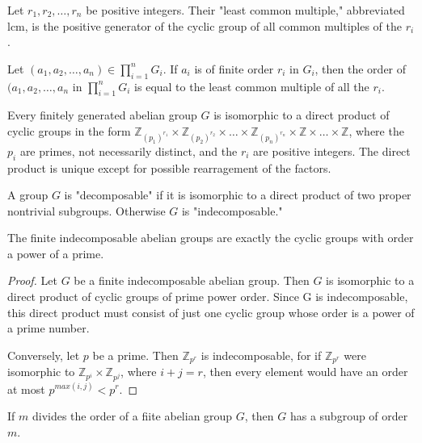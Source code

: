 \documentclass[a4paper,11pt]{article}
\begin{document}
\begin{outline}
    Let \(r_{1}, r_{2}, \ldots, r_{n}\) be positive integers. Their "least common multiple,"
    abbreviated lcm, is the positive generator of the cyclic group of all common multiples of the \(r_{i}\).
    
    Let \((a_{1}, a_{2}, \ldots, a_{n}) \in \prod_{i=1}^{n} G_{i}\). If \(a_{i}\) is of
    finite order \(r_{i}\) in \(G_{i}\), then the order of \((a_{1}, a_{2}, \ldots, a_{n}\) in 
    \(\prod_{i=1}^{n} G_{i}\) is equal to the least common multiple of all the \(r_{i}\).
    
    Every finitely generated abelian group \(G\) is isomorphic to a direct product of cyclic groups in 
    the form \(\mathbb{Z}_{(p_{1})^{r_{1}}} \times \mathbb{Z}_{(p_{2})^{r_{2}}} \times \ldots \times 
    \mathbb{Z}_{(p_{n})^{r_{n}}} \times \mathbb{Z} \times \ldots \times \mathbb{Z}\), where the \(p_{i}\) 
    are primes, not necessarily distinct, and the \(r_{i}\) are positive integers. The direct product is 
    unique except for possible rearragement of the factors.
    
    A group \(G\) is "decomposable" if it is isomorphic to a direct product of two proper
    nontrivial subgroups. Otherwise \(G\) is "indecomposable."
    
    The finite indecomposable abelian groups are exactly the cyclic groups with order a power of a prime.
    
    \begin{proof}
      \forward 
        Let \(G\) be a finite indecomposable abelian group. Then \(G\) is isomorphic to a 
        direct product of cyclic groups of prime power order. Since G is indecomposable, this direct product 
        must consist of just one cyclic group whose order is a power of a prime number.
        
      \backward 
        Conversely, let \(p\) be a prime. Then \(\mathbb{Z}_{p^{r}}\) is indecomposable, for 
        if \(\mathbb{Z}_{p^{r}}\) were isomorphic to \(\mathbb{Z}_{p^{i}} \times \mathbb{Z}_{p^{j}}\), where 
        \(i + j = r\), then every element would have an order at most \(p^{max(i, j)} < p^{r}\).
    \end{proof}
    
    If \(m\) divides the order of a fiite abelian group \(G\), then \(G\) has a subgroup of order \(m\).
    

\end{outline}
\end{document}
